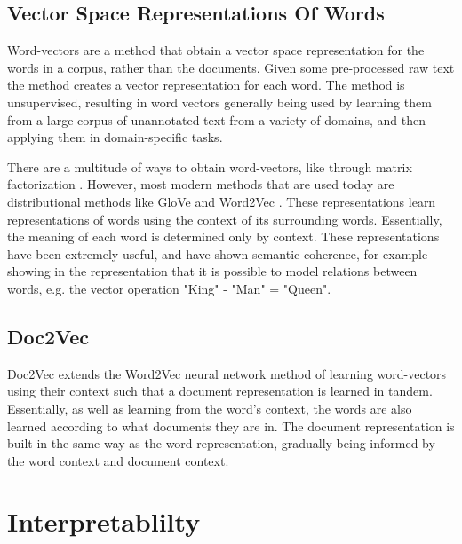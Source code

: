 


\subsection{Vector Space Representations Of Words}\label{bg:WordVectors}

Word-vectors are a method that obtain a vector space representation for the words in a corpus, rather than the documents. Given some pre-processed raw text the method creates a vector representation for each word. The method is unsupervised, resulting in word vectors generally being used by learning them from a large corpus of unannotated text from a variety of domains, and then applying them in domain-specific tasks.

There are a multitude of ways to obtain word-vectors, like through matrix factorization \cite{Evy2007}. However, most modern methods that are used today are distributional methods like GloVe \cite{Pennington2014} and Word2Vec \cite{Mikolov2013}. These representations learn representations of  words using the context of its surrounding words.  Essentially, the meaning of each word is determined only by  context. These representations have been extremely useful, and have shown semantic coherence, for example showing in the  representation that it is possible to  model relations between words, e.g.  the  vector operation  "King" - "Man" = "Queen".             

\subsection{Doc2Vec}\label{ch2:doc2vec}

Doc2Vec \cite{Le2014a} extends the Word2Vec neural network method of learning word-vectors using their context such that a document representation is learned in tandem. Essentially, as well as learning from the word's context, the words are also learned according to  what documents they are in. The document representation is built in the same way as the word representation, gradually being informed by the word context and document context.

\section{Interpretablilty}


